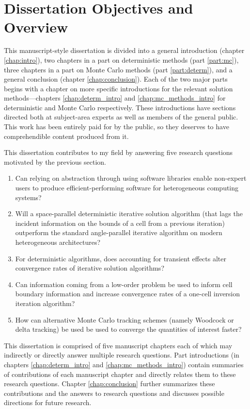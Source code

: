 \section{Dissertation Objectives and Overview}
\label{sec:research_qustions}

This manuscript-style dissertation is divided into a general introduction (chapter \ref{chap:intro}), two chapters in a part on deterministic methods (part \ref{part:mc}), three chapters in a part on Monte Carlo methods (part \ref{part:determ}), and a general conclusion (chapter \ref{chap:conclusion}).
Each of the two major parts begins with a chapter on more specific introductions for the relevant solution methods---chapters \ref{chap:determ_intro} and \ref{chap:mc_methods_intro} for deterministic and Monte Carlo respectively.
These introductions have sections directed both at subject-area experts as well as members of the general public.
This work has been entirely paid for by the public, so they deserves to have comprehendible content produced from it.

This dissertation contributes to my field by answering five research questions motivated by the previous section.
\begin{enumerate}
    \item Can relying on abstraction through using software libraries enable non-expert users to produce efficient-performing software for heterogeneous computing systems?
    \item Will a space-parallel deterministic iterative solution algorithm (that lags the incident information on the bounds of a cell from a previous iteration) outperform the standard angle-parallel iterative algorithm on modern heterogeneous architectures?
    \item For deterministic algorithms, does accounting for transient effects alter convergence rates of iterative solution algorithms?
    \item Can information coming from a low-order problem be used to inform cell boundary information and increase convergence rates of a one-cell inversion iteration algorithm?
    \item How can alternative Monte Carlo tracking schemes (namely Woodcock or delta tracking) be used be used to converge the quantities of interest faster?
\end{enumerate}

This dissertation is comprised of five manuscript chapters each of which may indirectly or directly answer multiple research questions.
Part introductions (in chapters \ref{chap:determ_intro} and \ref{chap:mc_methods_intro}) contain summaries of contributions of each manuscript chapter and directly relates them to these research questions.
Chapter \ref{chap:conclusion} further summarizes these contributions and the answers to research questions and discusses possible directions for future research.



